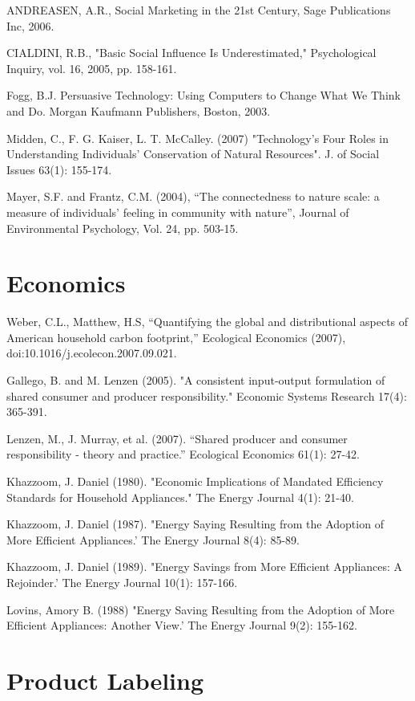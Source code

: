 ANDREASEN, A.R., Social Marketing in the 21st Century, Sage Publications Inc, 2006.

CIALDINI, R.B., "Basic Social Influence Is Underestimated," Psychological Inquiry,  vol. 16, 2005, pp. 158-161.

Fogg, B.J.  Persuasive Technology: Using Computers to Change What We Think and Do.  Morgan Kaufmann Publishers, Boston, 2003.

Midden, C., F. G. Kaiser, L. T. McCalley. (2007) "Technology’s Four Roles in Understanding Individuals’ Conservation of Natural Resources". J. of Social Issues 63(1): 155-174.

Mayer, S.F. and Frantz, C.M. (2004), “The connectedness to nature scale: a measure of individuals’ feeling in community with nature”, Journal of Environmental Psychology, Vol. 24, pp. 503-15. 



\section{Economics}
Weber, C.L., Matthew, H.S, “Quantifying the global and distributional 
aspects of American household carbon footprint,” Ecological Economics 
(2007), doi:10.1016/j.ecolecon.2007.09.021. 

Gallego, B. and M. Lenzen (2005). "A consistent input-output formulation of shared consumer and producer responsibility." Economic Systems Research 17(4): 
365-391.

Lenzen, M., J. Murray, et al. (2007). ``Shared producer and consumer responsibility - theory and practice.'' Ecological Economics 61(1): 27-42.

Khazzoom, J. Daniel (1980). "Economic Implications of Mandated Efficiency Standards for Household Appliances." The Energy Journal 4(1): 21-40.

Khazzoom, J. Daniel (1987). "Energy Saying Resulting from the Adoption of More Efficient Appliances.' The Energy Journal 8(4): 85-89.

Khazzoom, J. Daniel (1989). "Energy Savings from More Efficient Appliances: A Rejoinder.' The Energy Journal 10(1): 157-166.

Lovins, Amory B. (1988) "Energy Saving Resulting from the Adoption of More Efficient Appliances: Another View.' The Energy Journal 9(2): 155-162.


\section{Product Labeling}

